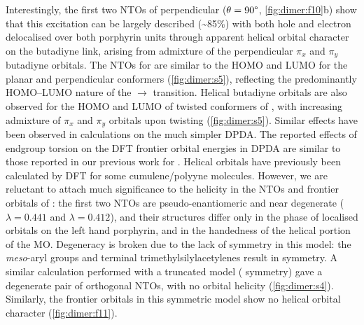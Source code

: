 		Interestingly, the first two NTOs of perpendicular  ($\theta = 90\degree$, \autoref{fig:dimer:f10}b) show that this excitation can be largely described (\textasciitilde{}85\%) with both hole and electron delocalised over both porphyrin units through apparent helical orbital character on the butadiyne link, arising from admixture of the perpendicular $\pi_x$ and $\pi_y$ butadiyne orbitals. The NTOs for  are similar to the HOMO and LUMO for the planar and perpendicular conformers (\autoref{fig:dimer:s5}), reflecting the predominantly HOMO--LUMO nature of the $\rightarrow{}$ transition. Helical butadiyne orbitals are also observed for the HOMO and LUMO of twisted conformers of , with increasing admixture of $\pi_x$ and $\pi_y$ orbitals upon twisting (\autoref{fig:dimer:s5}). Similar effects have been observed in calculations on the much simpler DPDA.\autocite{Thulstrup2011} The reported effects of endgroup torsion on the DFT frontier orbital energies in DPDA\autocite{Thulstrup2011} are similar to those reported in our previous work for .\autocite{Winters2007} Helical orbitals have previously been calculated by DFT for some cumulene/polyyne molecules.\autocite{Hendon2013,Liu2013} However, we are reluctant to attach much significance to the helicity in the NTOs and frontier orbitals of : the first two NTOs are pseudo-enantiomeric and near degenerate ($\lambda = 0.441$ and $\lambda = 0.412$), and their structures differ only in the phase of localised orbitals on the left hand porphyrin, and in the handedness of the helical portion of the MO\@. Degeneracy is broken due to the lack of symmetry in this model: the \textit{meso}-aryl groups and terminal trimethylsilylacetylenes result in  symmetry. A similar calculation performed with a truncated model ( symmetry) gave a degenerate pair of orthogonal NTOs, with no orbital helicity (\autoref{fig:dimer:s4}). Similarly, the frontier orbitals in this symmetric model show no helical orbital character (\autoref{fig:dimer:f11}).



